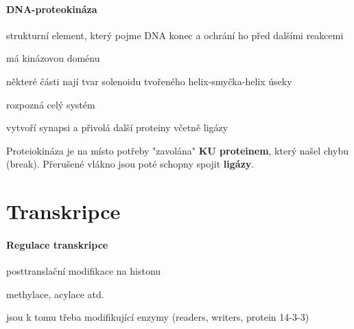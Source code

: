 \documentclass[DIV=8]{scrreprt}
\begin{document}
\paragraph{DNA-proteokináza}
\begin{myItemize}[nosep]
    \item strukturní element, který pojme DNA konec a ochrání ho před dalšími reakcemi
    \item má kinázovou doménu
    \item některé části nají tvar solenoidu tvořeného helix-smyčka-helix úseky
    \item rozpozná celý systém
    \item vytvoří synapsi a přivolá další proteiny včetně ligázy
\end{myItemize}



Proteiokináza je na místo potřeby "zavolána" \textbf{KU proteinem}, který našel chybu (break). Přerušené vlákno jsou poté schopny spojit \textbf{ligázy}.

\section{Transkripce} \label{Transkripce} \FloatBarrier


\paragraph{Regulace transkripce}
\begin{myItemize}[nosep]
    \item posttranslační modifikace na histonu
\begin{myItemize}[nosep]
    \item methylace, acylace atd.
    \item jsou k tomu třeba modifikující enzymy (readers, writers, protein 14-3-3)
\end{myItemize}

\end{myItemize}
\end{document}
